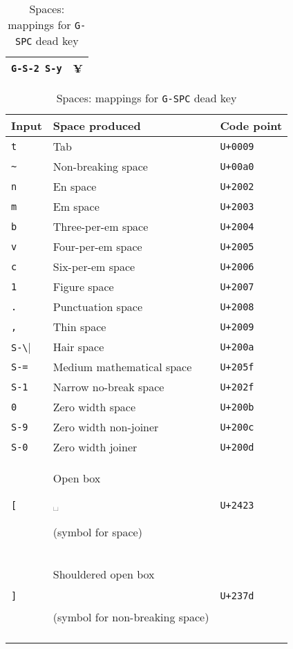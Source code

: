 \documentclass[oneside]{memoir}
\newcommand{\key}{\verb}
\newcommand{\keynv}{\texttt}
\newcommand{\out}[1]{\colorbox{gray!20}{\strut{}#1}}
\newcommand{\uni}[1]{\texttt{#1}}
\begin{document}
\begin{table}
\begin{minipage}{0.25\paperwidth}
\begin{tabular}{ll}
\key|G-S-2 S-y|                & ¥ \\
\bottomrule
\end{tabular}
\end{minipage}\hfill
\begin{minipage}{0.5\paperwidth}
\caption{Spaces: mappings for \keynv{G-SPC} dead key}
\label{tab:spaces}
\centering
\begin{tabular}{lll}
\toprule
Input     & Space produced                      & Code point \\
\midrule
\key|t|   & Tab                                 & \uni{U+0009} \\
\key|~|   & Non-breaking space                  & \uni{U+00a0} \\
\key|n|   & En space                            & \uni{U+2002} \\
\key|m|   & Em space                            & \uni{U+2003} \\
\key|b|   & Three-per-em space                  & \uni{U+2004} \\
\key|v|   & Four-per-em space                   & \uni{U+2005} \\
\key|c|   & Six-per-em space                    & \uni{U+2006} \\
\key|1|   & Figure space                        & \uni{U+2007} \\
\key|.|   & Punctuation space                   & \uni{U+2008} \\
\key|,|   & Thin space                          & \uni{U+2009} \\
\key|S-\| & Hair space                          & \uni{U+200a} \\
\key|S-=| & Medium mathematical space           & \uni{U+205f} \\
\key|S-1| & Narrow no-break space               & \uni{U+202f} \\
\key|0|   & Zero width space                    & \uni{U+200b} \\
\key|S-9| & Zero width non-joiner               & \uni{U+200c} \\
\key|S-0| & Zero width joiner                   & \uni{U+200d} \\
\key|[|   & Open box \out{␣} (symbol for space) & \uni{U+2423} \\
\key|]|
  & \makecell{Shouldered open box \out{\tfbs{⍽}}\\\quad(symbol for non-breaking space)}
  & \uni{U+237d} \\
\bottomrule&&
\end{tabular}
\end{minipage}
\end{table}
\end{document}
